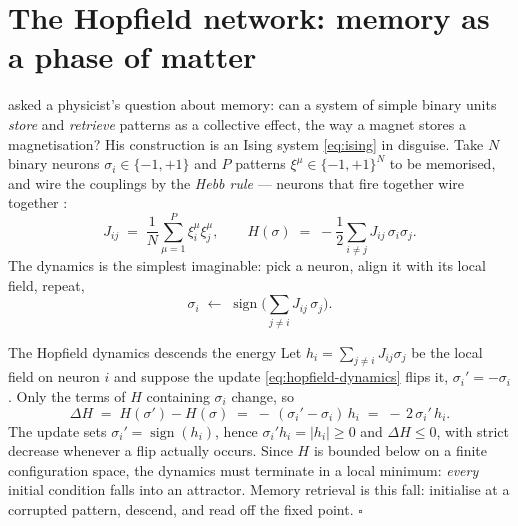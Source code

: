 \section{The Hopfield network: memory as a phase of matter}
\label{sec:hopfield}

\citet{hopfield1982neural} asked a physicist's question about memory: can a
system of simple binary units \emph{store} and \emph{retrieve} patterns as a
collective effect, the way a magnet stores a magnetisation? His construction
is an Ising system \eqref{eq:ising} in disguise. Take $N$ binary neurons
$\sigma_i \in \{-1,+1\}$ and $P$ patterns
$\xi^\mu \in \{-1,+1\}^N$ to be memorised, and wire the couplings by the
\emph{Hebb rule} --- neurons that fire together wire together
\citep{hebb1949organization}:
\begin{equation}
  J_{ij} \;=\; \frac{1}{N} \sum_{\mu=1}^{P} \xi_i^\mu \xi_j^\mu ,
  \qquad
  H(\sigma) \;=\; -\frac{1}{2}\sum_{i \neq j} J_{ij}\, \sigma_i \sigma_j .
  \label{eq:hopfield}
\end{equation}
The dynamics is the simplest imaginable: pick a neuron, align it with its
local field, repeat,
\begin{equation}
  \sigma_i \;\leftarrow\; \operatorname{sign}\Big( \textstyle\sum_{j \neq i}
  J_{ij}\, \sigma_j \Big).
  \label{eq:hopfield-dynamics}
\end{equation}

\begin{toolbox}{The Hopfield dynamics descends the energy}
Let $h_i = \sum_{j \neq i} J_{ij} \sigma_j$ be the local field on neuron $i$
and suppose the update \eqref{eq:hopfield-dynamics} flips it,
$\sigma_i' = -\sigma_i$. Only the terms of $H$ containing $\sigma_i$ change,
so
\begin{equation*}
  \Delta H
  \;=\; H(\sigma') - H(\sigma)
  \;=\; -\,(\sigma_i' - \sigma_i)\, h_i
  \;=\; -\,2\,\sigma_i'\, h_i .
\end{equation*}
The update sets $\sigma_i' = \operatorname{sign}(h_i)$, hence
$\sigma_i' h_i = |h_i| \geq 0$ and $\Delta H \leq 0$, with strict decrease
whenever a flip actually occurs. Since $H$ is bounded below on a finite
configuration space, the dynamics must terminate in a local minimum:
\emph{every} initial condition falls into an attractor. Memory retrieval is
this fall: initialise at a corrupted pattern, descend, and read off the
fixed point. \hfill$\square$
\end{toolbox}

